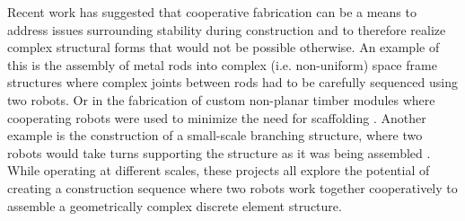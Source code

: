 Recent work has suggested that cooperative fabrication can be a means to address issues surrounding stability during construction and to therefore realize complex structural forms that would not be possible otherwise. An example of this is the assembly of metal rods into complex (i.e. non-uniform) space frame structures \cite{parascho_cooperative_2017, parascho_cooperative_2019} where complex joints between rods had to be carefully sequenced using two robots. Or in the fabrication of custom non-planar timber modules where cooperating robots were used to minimize the need for scaffolding \cite{thoma_robotic_2018}. Another example is the construction of a small-scale branching structure, where two robots would take turns supporting the structure as it was being assembled \cite{bruun_humanrobot_2020}. While operating at different scales, these projects all explore the potential of creating a construction sequence where two robots work together cooperatively to assemble a geometrically complex discrete element structure. 

